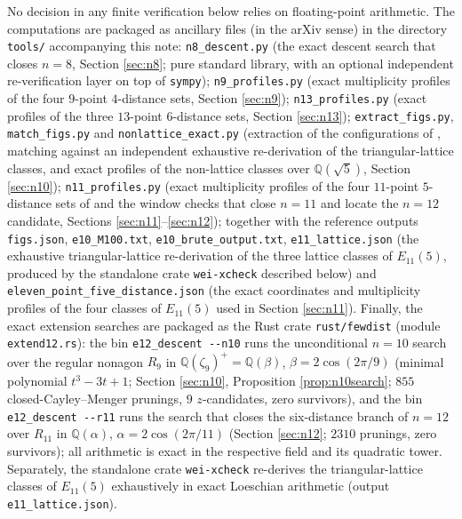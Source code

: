 \documentclass[11pt]{article}
\theoremstyle{definition}
\theoremstyle{remark}
\newcommand{\Q}{\mathbb{Q}}
\begin{document}
No decision in any finite verification below relies on floating-point arithmetic. The
computations are packaged as ancillary files (in the arXiv sense) in the directory
\texttt{tools/} accompanying this note:
\texttt{n8\_descent.py} (the exact descent search that closes $n = 8$, Section
\ref{sec:n8}; pure standard library, with an optional independent re-verification layer
on top of \texttt{sympy});
\texttt{n9\_profiles.py} (exact multiplicity profiles of the four $9$-point $4$-distance
sets, Section \ref{sec:n9});
\texttt{n13\_profiles.py} (exact profiles of the three $13$-point $6$-distance sets,
Section \ref{sec:n13});
\texttt{extract\_figs.py}, \texttt{match\_figs.py} and \texttt{nonlattice\_exact.py}
(extraction of the configurations of \cite[Figure~2]{Wei12}, matching against an
independent exhaustive re-derivation of the triangular-lattice classes, and exact
profiles of the non-lattice classes over $\Q(\sqrt5)$, Section \ref{sec:n10});
\texttt{n11\_profiles.py} (exact multiplicity profiles of the four $11$-point $5$-distance
sets of \cite[Theorem~13]{Wei11} and the window checks that close $n = 11$ and locate the
$n = 12$ candidate, Sections \ref{sec:n11}--\ref{sec:n12});
together with the reference outputs \texttt{figs.json}, \texttt{e10\_M100.txt},
\texttt{e10\_brute\_output.txt}, \texttt{e11\_lattice.json} (the exhaustive
triangular-lattice re-derivation of the three lattice classes of $E_{11}(5)$, produced by
the standalone crate \texttt{wei-xcheck} described below) and
\texttt{eleven\_point\_five\_distance.json} (the exact coordinates and multiplicity
profiles of the four classes of $E_{11}(5)$ used in Section \ref{sec:n11}).
Finally, the exact extension searches are packaged as the Rust crate \texttt{rust/fewdist}
(module \texttt{extend12.rs}): the bin \texttt{e12\_descent -{}-n10} runs the unconditional
$n = 10$ search over the regular nonagon $R_9$ in $\Q(\zeta_9)^+ = \Q(\beta)$,
$\beta = 2\cos(2\pi/9)$ (minimal polynomial $t^3 - 3t + 1$; Section \ref{sec:n10},
Proposition \ref{prop:n10search}; $855$ closed-Cayley--Menger prunings, $9$ $z$-candidates,
zero survivors), and the bin \texttt{e12\_descent -{}-r11} runs the search that closes the
six-distance branch of $n = 12$ over $R_{11}$ in $\Q(\alpha)$, $\alpha = 2\cos(2\pi/11)$
(Section \ref{sec:n12}; $2310$ prunings, zero survivors); all arithmetic is exact in the
respective field and its quadratic tower. Separately, the standalone crate
\texttt{wei-xcheck} re-derives
the triangular-lattice classes of $E_{11}(5)$ exhaustively in exact Loeschian arithmetic
(output \texttt{e11\_lattice.json}).
\end{document}
